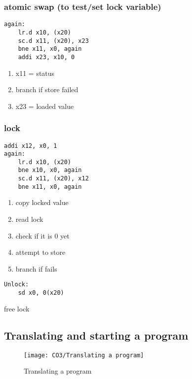 \subsubsection{atomic swap (to test/set lock variable)}
\begin{lstlisting}[language={[x86masm]Assembler},title={RISC-V assembly code}]
again:
    lr.d x10, (x20)
    sc.d x11, (x20), x23
    bne x11, x0, again
    addi x23, x10, 0
\end{lstlisting}
\begin{enumerate}
    \item x11 = status
    \item branch if store failed
    \item x23 = loaded value
\end{enumerate}

\subsubsection{lock}
\begin{lstlisting}[language={[x86masm]Assembler},title={RISC-V assembly code}]
    addi x12, x0, 1
again:
    lr.d x10, (x20)
    bne x10, x0, again
    sc.d x11, (x20), x12
    bne x11, x0, again
\end{lstlisting}
\begin{enumerate}
    \item copy locked value
    \item read lock
    \item check if it is 0 yet
    \item attempt to store
    \item branch if fails
\end{enumerate}

\begin{lstlisting}[language={[x86masm]Assembler},title={RISC-V assembly code}]
Unlock: 
    sd x0, 0(x20)
\end{lstlisting}
free lock

\subsection{Translating and starting a program}
\begin{figure}[!htb]
    \centering
    \texttt{[image: CO3/Translating a program]}
    \caption{Translating a program}
\end{figure}

